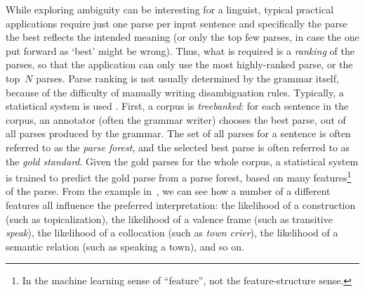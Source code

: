 \documentclass[output=paper,nonflat]{langsci/langscibook}
\begin{document}
While exploring ambiguity can be interesting for a linguist,
typical practical applications require just one parse per input sentence
and specifically the parse the best reflects the intended meaning
(or only the top few parses, in case the one put forward as `best' might be wrong).
Thus, what is required is a \textit{ranking} of the parses,
so that the application can only use the most highly-ranked parse,
or the top~$N$ parses.
Parse ranking is not usually determined by the grammar itself,
because of the difficulty of manually writing disambiguation rules.
Typically, a statistical system is used \citep{OFTM2004a-u-platte}.
First, a corpus is \textit{treebanked}:
for each sentence in the corpus,
an annotator (often the grammar writer) chooses the best parse,
out of all parses produced by the grammar.
The set of all parses for a sentence is often referred to as the \textit{parse forest},
and the selected best parse is often referred to as the \textit{gold standard}.
Given the gold parses for the whole corpus, a statistical system is trained
to predict the gold parse from a parse forest,
based on many features\footnote{%
	In the machine learning sense of ``feature'',
	not the feature-structure sense.
}
of the parse.
From the example in~,
we can see how a number of a different features all influence the preferred interpretation:
the likelihood of a construction (such as topicalization),
the likelihood of a valence frame (such as transitive \textit{speak}),
the likelihood of a collocation (such as \textit{town crier}),
the likelihood of a semantic relation (such as speaking a town),
and so on.


\end{document}
